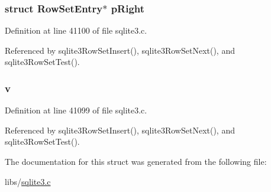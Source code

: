 \hypertarget{struct_row_set_entry_a5446f488550091a9170f6972c1861ee2}{}
\subsubsection[{p\+Right}]{\setlength{\rightskip}{0pt plus 5cm}struct {\bf Row\+Set\+Entry}$\ast$ p\+Right}\label{struct_row_set_entry_a5446f488550091a9170f6972c1861ee2}


Definition at line 41100 of file sqlite3.\+c.



Referenced by sqlite3\+Row\+Set\+Insert(), sqlite3\+Row\+Set\+Next(), and sqlite3\+Row\+Set\+Test().

\hypertarget{struct_row_set_entry_a6b83b4ae6bcb5f4033acf9f93959363f}{}
\subsubsection[{v}]{ v}\label{struct_row_set_entry_a6b83b4ae6bcb5f4033acf9f93959363f}


Definition at line 41099 of file sqlite3.\+c.



Referenced by sqlite3\+Row\+Set\+Insert(), sqlite3\+Row\+Set\+Next(), and sqlite3\+Row\+Set\+Test().



The documentation for this struct was generated from the following file\+:\begin{DoxyCompactItemize}
\item 
libs/\hyperlink{sqlite3_8c}{sqlite3.\+c}\end{DoxyCompactItemize}
